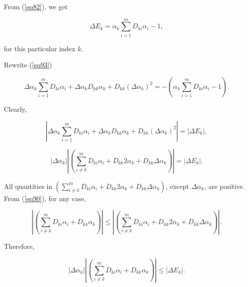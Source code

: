 \documentclass [18pt]{article}
\begin{document}
From (\ref{eq82}), we get


\begin{equation}
\label{eq94}
\Delta E_k = \alpha _k \sum\limits_{i = 1}^m {D_{ki} \alpha _i } - 1,
\end{equation}



\noindent
for this particular index $k$.

Rewrite (\ref{eq93})


\begin{equation}
\label{eq95}
\Delta \alpha _k \sum\limits_{i = 1}^m {D_{ki} \alpha _i } + \Delta \alpha
_k D_{kk} \alpha _k + D_{kk} (\Delta \alpha _k )^2 = - (\alpha _k
\sum\limits_{i = 1}^m {D_{ki} \alpha _i } - 1).
\end{equation}



Clearly,


\begin{equation}
\label{eq96}
\left| {\Delta \alpha _k \sum\limits_{i = 1}^m {D_{ki} \alpha _i } + \Delta
\alpha _k D_{kk} \alpha _k + D_{kk} (\Delta \alpha _k )^2} \right| = \left|
{\Delta E_k } \right|,
\end{equation}




\begin{equation}
\label{eq97}
\left| {\Delta \alpha _k } \right|\left| {(\sum\limits_{i \ne k}^m {D_{ki}
\alpha _i } + D_{kk} 2\alpha _k + D_{kk} \Delta \alpha _k )} \right| =
\left| {\Delta E_k } \right|.
\end{equation}



All quantities in $(\sum\limits_{i \ne k}^m {D_{ki} \alpha _i } + D_{kk}
2\alpha _k + D_{kk} \Delta \alpha _k )$, except $\Delta \alpha _k $, are
positive. From (\ref{eq90}), for any case,


\begin{equation}
\label{eq98}
\left| {(\sum\limits_{i \ne k}^m {D_{ki} \alpha _i } + D_{kk} \alpha _k )}
\right| \le \left| {(\sum\limits_{i \ne k}^m {D_{ki} \alpha _i } + D_{kk}
2\alpha _k + D_{kk} \Delta \alpha _k )} \right|.
\end{equation}



Therefore,


\begin{equation}
\label{eq99}
\left| {\Delta \alpha _k } \right|\left| {(\sum\limits_{i \ne k}^m {D_{ki}
\alpha _i } + D_{kk} \alpha _k )} \right| \le \left| {\Delta E_k } \right|.
\end{equation}
\end{document}
